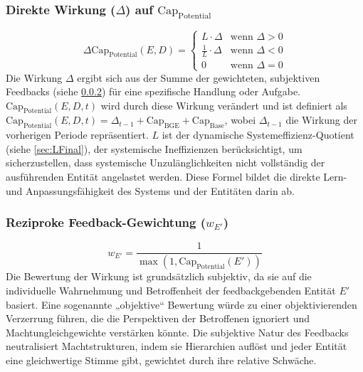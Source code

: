 \documentclass[12pt]{scrartcl}
\begin{document}
\subsubsection{Direkte Wirkung ($\Delta$) auf $\text{Cap}_{\text{Potential}}$}
\label{sec:DeltaCapPotential}
\begin{equation}
\Delta \text{Cap}_{\text{Potential}}(E,D) =
\begin{cases}
L \cdot \Delta & \text{wenn } \Delta > 0 \\
\frac{1}{L} \cdot \Delta & \text{wenn } \Delta < 0 \\
0 & \text{wenn } \Delta = 0
\end{cases}
\label{eq:DeltaCapPotentialFinal}
\end{equation}
Die Wirkung $\Delta$ ergibt sich aus der Summe der gewichteten, subjektiven Feedbacks (siehe \ref{sec:wEFinal}) für eine spezifische Handlung oder Aufgabe. $\text{Cap}_{\text{Potential}}(E,D,t)$ wird durch diese Wirkung verändert und ist definiert als $\text{Cap}_{\text{Potential}}(E,D,t) = \Delta_{t-1} + \text{Cap}_{\text{BGE}} + \text{Cap}_{\text{Base}}$, wobei $\Delta_{t-1}$ die Wirkung der vorherigen Periode repräsentiert. $L$ ist der dynamische Systemeffizienz-Quotient (siehe \ref{sec:LFinal}), der systemische Ineffizienzen berücksichtigt, um sicherzustellen, dass systemische Unzulänglichkeiten nicht vollständig der ausführenden Entität angelastet werden. Diese Formel bildet die direkte Lern- und Anpassungsfähigkeit des Systems und der Entitäten darin ab.

\subsubsection{Reziproke Feedback-Gewichtung ($w_{E'}$)}
\label{sec:wEFinal}
\begin{equation}
w_{E'} = \frac{1}{\max(1, \text{Cap}_{\text{Potential}}(E'))}
\label{eq:wEFinal}
\end{equation}
Die Bewertung der Wirkung ist grundsätzlich subjektiv, da sie auf die individuelle Wahrnehmung und Betroffenheit der feedbackgebenden Entität $E'$ basiert. Eine sogenannte „objektive“ Bewertung würde zu einer objektivierenden Verzerrung führen, die die Perspektiven der Betroffenen ignoriert und Machtungleichgewichte verstärken könnte. Die subjektive Natur des Feedbacks neutralisiert Machtstrukturen, indem sie Hierarchien auflöst und jeder Entität eine gleichwertige Stimme gibt, gewichtet durch ihre relative Schwäche.

\end{document}
